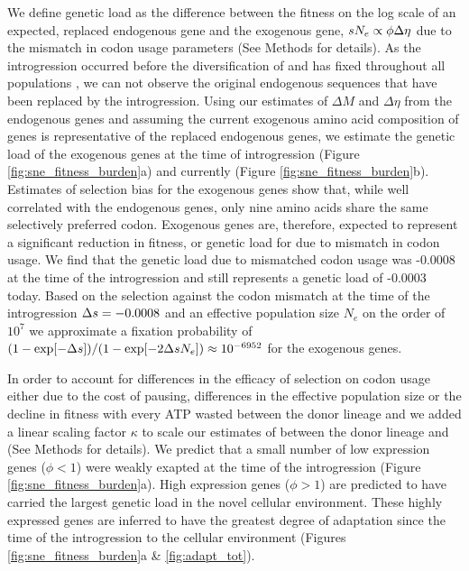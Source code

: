 \documentclass[fleqn,letterpaper]{article}
\begin{document}
We define genetic load as the difference between the fitness on the log scale of an expected, replaced endogenous gene and the exogenous gene, $sN_e \propto \phi {\Delta \eta}$ due to the mismatch in codon usage parameters (See Methods for details).
As the introgression occurred before the diversification of \kluyveri and has fixed throughout all populations \citep{friedrich2015}, we can not observe the original endogenous sequences that have been replaced by the introgression.
Using our estimates of $\Delta M$ and $\Delta \eta$ from the endogenous genes and assuming the current exogenous amino acid composition of genes is representative of the replaced endogenous genes, we estimate the genetic load of the exogenous genes at the time of introgression (Figure \ref{fig:sne_fitness_burden}a) and currently (Figure \ref{fig:sne_fitness_burden}b).
Estimates of selection bias for the exogenous genes show that, while well correlated with the endogenous genes, only nine amino acids share the same selectively preferred codon.
Exogenous genes are, therefore, expected to represent a significant reduction in fitness, or genetic load for \kluyveri due to mismatch in codon usage.
We find that the genetic load \GL due to mismatched codon usage was -0.0008 at the time of the introgression and still represents a genetic load of -0.0003 today.
Based on the selection against the codon mismatch at the time of the introgression ${\Delta s} = -0.0008$ and an effective population size $N_e$ on the order of $10^7$ \citep{wagner2005} we approximate a fixation probability of $(1-\exp[-{\Delta s}])/(1-\exp[-2{\Delta s} N_e]) \approx 10^{-6952}$ \citep{SellaAndHirsh2005} for the exogenous genes.

In order to account for differences in the efficacy of selection on codon usage either due to the cost of pausing, differences in the effective population size or the decline in fitness with every ATP wasted between the donor lineage and \kluyveri we added a linear scaling factor $\kappa$ to scale our estimates of \DE between the donor lineage and \kluyveri  (See Methods for details).
We predict that a small number of low expression genes ($\phi < 1$) were weakly exapted at the time of the introgression (Figure \ref{fig:sne_fitness_burden}a).
High expression genes ($\phi > 1$) are predicted to have carried the largest genetic load in the novel cellular environment.
These highly expressed genes are inferred to have the greatest degree of adaptation since the time of the introgression to the \kluyveri cellular environment (Figures \ref{fig:sne_fitness_burden}a \& \ref{fig:adapt_tot}).
\end{document}
